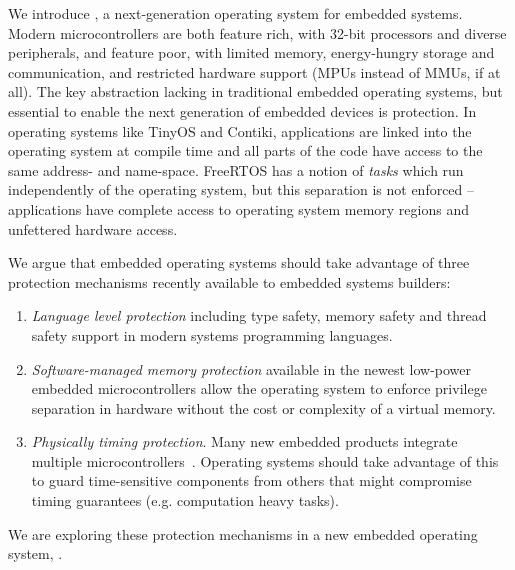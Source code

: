 We introduce \name, a next-generation operating system for embedded systems.
Modern microcontrollers are both feature rich, with 32-bit processors and
diverse peripherals, and feature poor, with limited memory, energy-hungry
storage and communication, and restricted hardware support (MPUs instead of
MMUs, if at all).
The key abstraction lacking in traditional embedded operating systems, but
essential to enable the next generation of embedded devices is protection. In
operating systems like TinyOS and Contiki, applications are linked into the
operating system at compile time and all parts of the code have access to the
same address- and name-space. FreeRTOS has a notion of \emph{tasks} which run
independently of the operating system, but this separation is not enforced --
applications have complete access to operating system memory regions and
unfettered hardware access.

We argue that embedded operating systems should take advantage of three
protection mechanisms recently available to embedded systems builders:

\begin{enumerate}
  \item \emph{Language level protection} including type safety, memory safety
    and thread safety support in modern systems programming languages.
  \item \emph{Software-managed memory protection} available in the newest
    low-power embedded microcontrollers allow the operating system to enforce
    privilege separation in hardware without the cost or complexity of a virtual
    memory.
  \item \emph{Physically timing protection}. Many new embedded products
    integrate multiple microcontrollers~.
  Operating systems should take advantage of this to guard time-sensitive
  components from others that might compromise timing guarantees (e.g.
  computation heavy tasks).
\end{enumerate}

We are exploring these protection mechanisms in a new embedded operating system,
\name.

